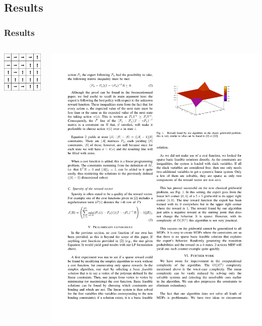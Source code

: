 \documentclass{beamer}
\begin{document}
\subsection{Results}
\begin{frame}
\frametitle{Results}
\label{sec-4_3_1}
\begin{columns}
\begin{column}{0.4\textwidth}
\label{sec-4_3_1_1}
\includegraphics[width=10em]{Pi_E.png}
\end{column}
\begin{column}{0.4\textwidth}
\includegraphics[width=\textwidth]{Results.pdf}
\end{column}
\end{columns}
\end{frame}
\end{document}
